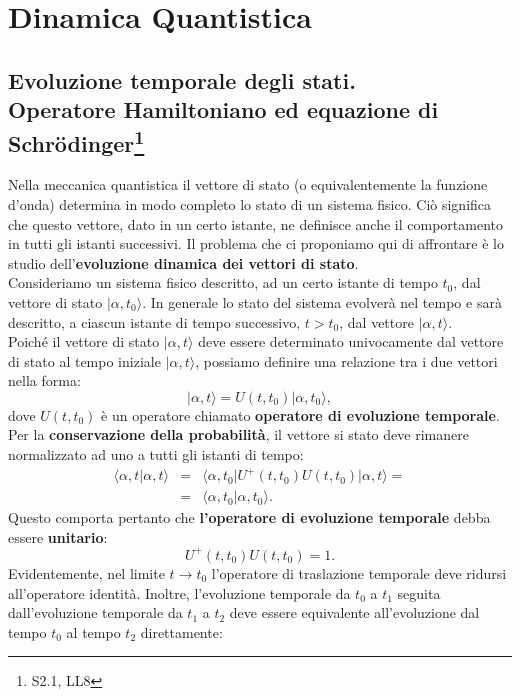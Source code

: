 \chapter{Dinamica Quantistica}
\section[Evoluzione temporale degli stati]{Evoluzione temporale degli stati.\\Operatore Hamiltoniano ed equazione di Schr\"{o}dinger\footnote{S2.1, LL8} }
Nella meccanica quantistica il vettore di stato (o equivalentemente la funzione d'onda) determina in modo completo lo stato di un sistema fisico. Ciò significa che questo vettore, dato in un certo istante, ne definisce anche il comportamento in tutti gli istanti successivi. Il problema che ci proponiamo qui di affrontare è lo studio dell'\textbf{evoluzione dinamica dei vettori di stato}.\\
Consideriamo un sistema fisico descritto, ad un certo istante di tempo $t_0$, dal vettore di stato $\vert \alpha, t_0 \rangle$. In generale lo stato del sistema evolverà nel tempo e sarà descritto, a ciascun istante di tempo successivo, $t>t_0$, dal vettore $\vert \alpha, t\rangle$.\\
Poiché il vettore di stato $\vert \alpha, t \rangle$ deve essere determinato univocamente dal vettore di stato al tempo iniziale $\vert \alpha, t \rangle$, possiamo definire una relazione tra i due vettori nella forma: \begin{equation}
\vert \alpha, t \rangle = U(t,t_0)\vert \alpha, t_0 \rangle,
\end{equation}
dove $U(t,t_0)$ è un operatore chiamato \textbf{operatore di evoluzione temporale}.\\
Per la \textbf{conservazione della probabilità}, il vettore si stato deve rimanere normalizzato ad uno a tutti gli istanti di tempo:
\begin{eqnarray}
\langle \alpha, t \vert \alpha, t \rangle & = &
\langle \alpha, t_0 \vert U^+ (t,t_0) U(t,t_0)\vert \alpha, t \rangle = \nonumber\\
& = & \langle \alpha, t_0 \vert \alpha, t_0 \rangle.
\end{eqnarray}
Questo comporta pertanto che  \textbf{l'operatore di evoluzione temporale} debba essere \textbf{unitario}:
\begin{equation}
U^+ (t,t_0) U(t,t_0)=1.
\end{equation}
Evidentemente, nel limite $t\longrightarrow t_0$ l'operatore di traslazione temporale deve ridursi all'operatore identità. Inoltre, l'evoluzione temporale da $t_0$ a $t_1$ seguita dall'evoluzione temporale da $t_1$ a $t_2$ deve essere equivalente all'evoluzione dal tempo $t_0$ al tempo $t_2$ direttamente:
